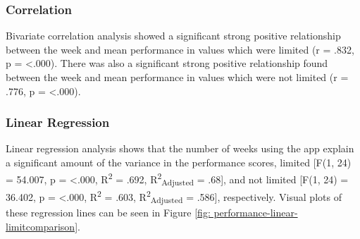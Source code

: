 \subsubsection{Correlation}
Bivariate correlation analysis showed a significant strong positive relationship between the week and mean performance in values which were limited (r = .832, p = \textless .000). There was also a significant strong positive relationship found between the week and mean performance in values which were not limited (r = .776, p = \textless .000).

\subsubsection{Linear Regression}
Linear regression analysis shows that the number of weeks using the app explain a significant amount of the variance in the performance scores, limited [F(1, 24) = 54.007, p = \textless.000, R\textsuperscript{2} = .692, R\textsuperscript{2}\textsubscript{Adjusted} = .68], and not limited [F(1, 24) = 36.402, p = \textless.000, R\textsuperscript{2} = .603, R\textsuperscript{2}\textsubscript{Adjusted} = .586], respectively. Visual plots of these regression lines can be seen in Figure \ref{fig: performance-linear-limitcomparison}.


